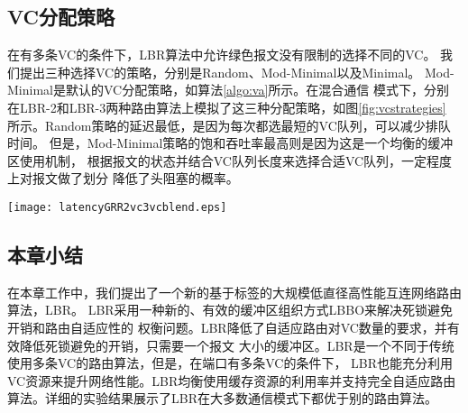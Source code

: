   \subsection{VC分配策略}

  在有多条VC的条件下，LBR算法中允许绿色报文没有限制的选择不同的VC。
  我们提出三种选择VC的策略，分别是Random、Mod-Minimal以及Minimal。
  Mod-Minimal是默认的VC分配策略，如算法\ref{algo:va}所示。在混合通信
  模式下，分别在LBR-2和LBR-3两种路由算法上模拟了这三种分配策略，如图\ref{fig:vcstrategies}
  所示。Random策略的延迟最低，是因为每次都选最短的VC队列，可以减少排队时间。
  但是，Mod-Minimal策略的饱和吞吐率最高则是因为这是一个均衡的缓冲区使用机制，
  根据报文的状态并结合VC队列长度来选择合适VC队列，一定程度上对报文做了划分
  降低了头阻塞的概率。


    \begin{figure*}[t]
     \centering
    \texttt{[image: latencyGRR2vc3vcblend.eps]}
  \caption{混合通信模式下VC分配策略性能比较}
  \label{fig:vcstrategies}

\end{figure*}


  \subsection{本章小结}

  在本章工作中，我们提出了一个新的基于标签的大规模低直径高性能互连网络路由算法，LBR。
  LBR采用一种新的、有效的缓冲区组织方式LBBO来解决死锁避免开销和路由自适应性的
  权衡问题。LBR降低了自适应路由对VC数量的要求，并有效降低死锁避免的开销，只需要一个报文
  大小的缓冲区。LBR是一个不同于传统使用多条VC的路由算法，但是，在端口有多条VC的条件下，
  LBR也能充分利用VC资源来提升网络性能。LBR均衡使用缓存资源的利用率并支持完全自适应路由
  算法。详细的实验结果展示了LBR在大多数通信模式下都优于别的路由算法。


